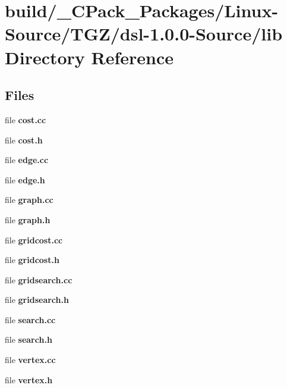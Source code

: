 \section{build/\-\_\-\-C\-Pack\-\_\-\-Packages/\-Linux-\/\-Source/\-T\-G\-Z/dsl-\/1.0.0-\/\-Source/lib Directory Reference}
\label{dir_61cd1fb5fb48808d9170e66ec6df6fde}
\subsection*{Files}
\begin{DoxyCompactItemize}
\item 
file {\bf cost.\-cc}
\item 
file {\bf cost.\-h}
\item 
file {\bf edge.\-cc}
\item 
file {\bf edge.\-h}
\item 
file {\bf graph.\-cc}
\item 
file {\bf graph.\-h}
\item 
file {\bf gridcost.\-cc}
\item 
file {\bf gridcost.\-h}
\item 
file {\bf gridsearch.\-cc}
\item 
file {\bf gridsearch.\-h}
\item 
file {\bf search.\-cc}
\item 
file {\bf search.\-h}
\item 
file {\bf vertex.\-cc}
\item 
file {\bf vertex.\-h}
\end{DoxyCompactItemize}

